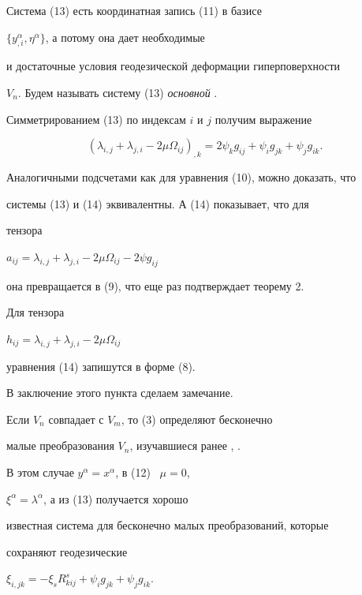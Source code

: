 Система (13) есть координатная запись (11) в базисе 


$\{y_{,i}^\alpha ,\eta^\alpha \}$, а потому она дает необходимые


и достаточные условия геодезической деформации гиперповерхности


$V_n$. Будем называть систему (13) {\it основной} \cite{ga89}.





Симметрированием (13) по индексам $i$ и $j$ получим выражение


\begin{equation}


(\lambda_{i,j}+\lambda_{j,i}-2\mu \Omega_{ij})_{,k}=2\psi_kg_{ij}+\psi


_ig_{jk}+\psi_jg_{ik}.


\end{equation}


Аналогичными подсчетами как для уравнения (10), можно доказать, что


системы (13) и (14) эквивалентны. А (14) показывает, что для


тензора


$a_{ij}=\lambda_{i,j}+\lambda_{j,i}-2\mu \Omega_{ij}-2\psi g_{ij}$


она превращается в (9), что еще раз подтверждает теорему 2.





Для тензора


$h_{ij}=\lambda_{i,j}+\lambda_{j,i}-2\mu \Omega_{ij}$


уравнения (14) запишутся в форме (8).


В заключение этого пункта сделаем замечание.





Если $V_n$ совпадает с $V_m$, то (3) определяют бесконечно


малые преобразования $V_n$, изучавшиеся ранее \cite{ei}, \cite{kaj}.


В этом случае $y^\alpha =x^\alpha $, в (12) \ $\mu =0$, 


$\xi^\alpha =\lambda^\alpha $, а из (13) получается хорошо


известная система для бесконечно малых преобразований, которые


сохраняют геодезические


$\xi_{i,jk}=-\xi_sR_{kij}^s+\psi_ig_{jk}+\psi_jg_{ik}$. 


